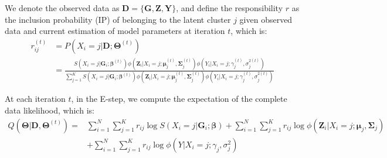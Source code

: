 We denote the observed data as
\(\boldsymbol{\mathbf{D}} = \{\boldsymbol{\mathbf{G}}, \boldsymbol{\mathbf{Z}}, \boldsymbol{\mathbf{Y}}\}\),
and define the responsibility \(r\) as the inclusion probability (IP) of
belonging to the latent cluster \(j\) given observed data and current
estimation of model parameters at iteration \(t\), which is:
\[\begin{aligned}
        r_{ij}^{(t)} & = P(X_i = j|\boldsymbol{\mathbf{D}}; \boldsymbol{\mathbf{\Theta}}^{(t)}) \\
            & = \frac{S\left(X_i = j| \boldsymbol{\mathbf{G}}_i; \boldsymbol{\mathbf{\beta}}^{(t)}\right) \phi\left(\boldsymbol{\mathbf{Z}}_i| X_i = j; \boldsymbol{\mathbf{\mu}}_j^{(t)}, \boldsymbol{\mathbf{\Sigma}}_j^{(t)}\right) \phi\left(Y_i|X_i = j; \gamma_j^{(t)}, \sigma^{2(t)}_j \right)}{\sum_{j = 1}^K S\left(X_i = j| \boldsymbol{\mathbf{G}}_i; \boldsymbol{\mathbf{\beta}}^{(t)}\right) \phi \left(\boldsymbol{\mathbf{Z}}_i| X_i = j; \boldsymbol{\mathbf{\mu}}_j^{(t)}, \boldsymbol{\mathbf{\Sigma}}_j^{(t)}\right) \phi \left(Y_i|X_i = j; \gamma_j^{(t)}, \sigma^{2(t)}_j\right)}
    \end{aligned}
    \label{eq3}   \label{eq:eq3}\]

At each iteration \(t\), in the E-step, we compute the expectation of the
complete data likelihood, which is:
\[\begin{aligned}
        Q(\boldsymbol{\mathbf{\Theta}}|\boldsymbol{\mathbf{D}}, \boldsymbol{\mathbf{\Theta}}^{(t)}) = & \sum_{i=1}^N\sum_{j=1}^K r_{ij} \log S\left(X_i = j|\boldsymbol{\mathbf{G}}_i;\boldsymbol{\mathbf{\beta}}\right) + \sum_{i=1}^N\sum_{j=1}^K r_{ij} \log \phi(\boldsymbol{\mathbf{Z}}_i|X_i = j;\boldsymbol{\mathbf{\mu}}_j, \boldsymbol{\mathbf{\Sigma}}_j) \\
        & + \sum_{i=1}^N\sum_{j=1}^K r_{ij} \log \phi\left(Y|X_i = j; \gamma_j, \sigma_j^2\right)
    \end{aligned}
    \label{eq4}   \label{eq:eq4}\]

